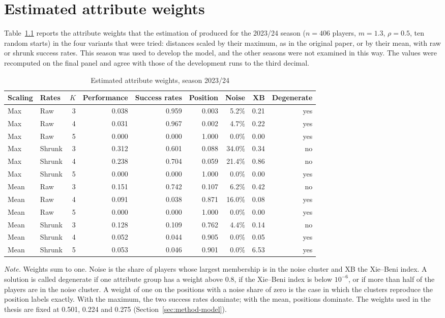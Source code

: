 \chapter{Estimated attribute weights}
\label{app:weights}

Table~\ref{tab:weights} reports the attribute weights that the estimation of  produced for the 2023/24 season ($n=406$ players, $m=1.3$, $\rho=0.5$, ten random starts) in the four variants that were tried: distances scaled by their maximum, as in the original paper, or by their mean, with raw or shrunk success rates. This season was used to develop the model, and the other seasons were not examined in this way. The values were recomputed on the final panel and agree with those of the development runs to the third decimal.

\begin{table}[ht]
	\centering
	\small
	\caption{Estimated attribute weights, season 2023/24}
	\label{tab:weights}
	\begin{tabular}{llrrrrrrr}
		\toprule
		Scaling & Rates & $K$ & Performance & Success rates & Position & Noise & XB & Degenerate \\
		\midrule
		Max & Raw & 3 & 0.038 & 0.959 & 0.003 & 5.2\% & 0.21 & yes \\
		Max & Raw & 4 & 0.031 & 0.967 & 0.002 & 4.7\% & 0.22 & yes \\
		Max & Raw & 5 & 0.000 & 0.000 & 1.000 & 0.0\% & 0.00 & yes \\
		Max & Shrunk & 3 & 0.312 & 0.601 & 0.088 & 34.0\% & 0.34 & no \\
		Max & Shrunk & 4 & 0.238 & 0.704 & 0.059 & 21.4\% & 0.86 & no \\
		Max & Shrunk & 5 & 0.000 & 0.000 & 1.000 & 0.0\% & 0.00 & yes \\
		Mean & Raw & 3 & 0.151 & 0.742 & 0.107 & 6.2\% & 0.42 & no \\
		Mean & Raw & 4 & 0.091 & 0.038 & 0.871 & 16.0\% & 0.08 & yes \\
		Mean & Raw & 5 & 0.000 & 0.000 & 1.000 & 0.0\% & 0.00 & yes \\
		Mean & Shrunk & 3 & 0.128 & 0.109 & 0.762 & 4.4\% & 0.14 & no \\
		Mean & Shrunk & 4 & 0.052 & 0.044 & 0.905 & 0.0\% & 0.05 & yes \\
		Mean & Shrunk & 5 & 0.053 & 0.046 & 0.901 & 0.0\% & 6.53 & yes \\
		\bottomrule
	\end{tabular}
	\par\smallskip
	\parbox{0.95\textwidth}{\footnotesize\emph{Note.} Weights sum to one. Noise is the share of players whose largest membership is in the noise cluster and XB the Xie--Beni index. A solution is called degenerate if one attribute group has a weight above 0.8, if the Xie--Beni index is below $10^{-6}$, or if more than half of the players are in the noise cluster. A weight of one on the positions with a noise share of zero is the case in which the clusters reproduce the position labels exactly. With the maximum, the two success rates dominate; with the mean, positions dominate. The weights used in the thesis are fixed at 0.501, 0.224 and 0.275 (Section~\ref{sec:method-model}).}
\end{table}

